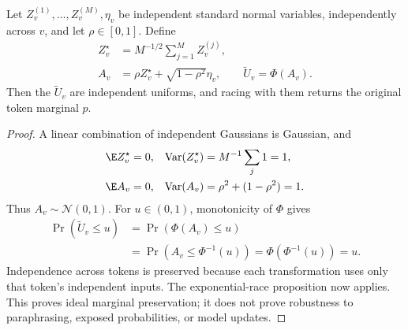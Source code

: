 \begin{proposition}
Let $Z_v^{(1)},\ldots,Z_v^{(M)},\eta_v$ be independent standard normal variables, independently across $v$, and let $\rho\in[0,1]$. Define
\begin{align}
Z_v^\star&=M^{-1/2}\sum_{j=1}^M Z_v^{(j)},\\
A_v&=\rho Z_v^\star+\sqrt{1-\rho^2}\eta_v,\qquad \widetilde U_v=\Phi(A_v).
\end{align}
Then the $\widetilde U_v$ are independent uniforms, and racing with them returns the original token marginal $p$.
\end{proposition}
\begin{proof}
A linear combination of independent Gaussians is Gaussian, and
\begin{align}
\E Z_v^\star&=0,&\operatorname{Var}(Z_v^\star)&=M^{-1}\sum_j1=1,\\
\E A_v&=0,&\operatorname{Var}(A_v)&=\rho^2+(1-\rho^2)=1.
\end{align}
Thus $A_v\sim\mathcal N(0,1)$. For $u\in(0,1)$, monotonicity of $\Phi$ gives
\begin{align}
\Pr(\widetilde U_v\leq u)
&=\Pr(\Phi(A_v)\leq u)\\
&=\Pr(A_v\leq\Phi^{-1}(u))
 =\Phi(\Phi^{-1}(u))=u.
\end{align}
Independence across tokens is preserved because each transformation uses only that token's independent inputs. The exponential-race proposition now applies. This proves ideal marginal preservation; it does not prove robustness to paraphrasing, exposed probabilities, or model updates.
\end{proof}
